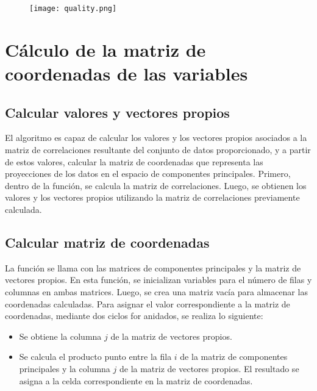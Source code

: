 \documentclass{article}
\begin{document}
\begin{figure}[h]
    \centering
    \texttt{[image: quality.png]}
    \label{fig:my_label}
\end{figure}

\section{Cálculo de la matriz de coordenadas de las variables}

\subsection{Calcular valores y vectores propios}
El algoritmo es capaz de calcular los valores y los vectores propios asociados a la matriz de correlaciones resultante del conjunto de datos proporcionado, y a partir de estos valores, calcular la matriz de coordenadas que representa las proyecciones de los datos en el espacio de componentes principales. Primero, dentro de la función, se calcula la matriz de correlaciones. Luego, se obtienen los valores y los vectores propios utilizando la matriz de correlaciones previamente calculada.

\subsection{Calcular matriz de coordenadas}
La función se llama con las matrices de componentes principales y la matriz de vectores propios. En esta función, se inicializan variables para el número de filas y columnas en ambas matrices. Luego, se crea una matriz vacía para almacenar las coordenadas calculadas. Para asignar el valor correspondiente a la matriz de coordenadas, mediante dos ciclos for anidados, se realiza lo siguiente:
\begin{itemize}
    \item Se obtiene la columna \( j \) de la matriz de vectores propios.
    \item Se calcula el producto punto entre la fila \( i \) de la matriz de componentes principales y la columna \( j \) de la matriz de vectores propios. El resultado se asigna a la celda correspondiente en la matriz de coordenadas.
\end{itemize}
\end{document}
